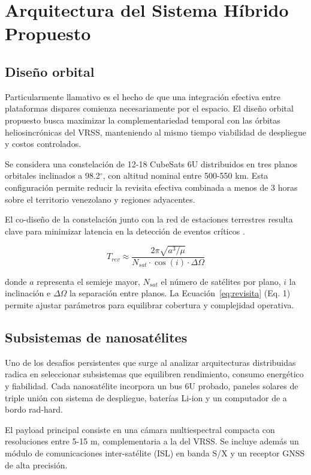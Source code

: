 \section{Arquitectura del Sistema Híbrido Propuesto}

\subsection{Diseño orbital}

Particularmente llamativo es el hecho de que una integración efectiva entre plataformas dispares comienza necesariamente por el espacio. El diseño orbital propuesto busca maximizar la complementariedad temporal con las órbitas heliosincrónicas del VRSS, manteniendo al mismo tiempo viabilidad de despliegue y costos controlados.

Se considera una constelación de 12-18 CubeSats 6U distribuidos en tres planos orbitales inclinados a 98.2$^\circ$, con altitud nominal entre 500-550 km. Esta configuración permite reducir la revisita efectiva combinada a menos de 3 horas sobre el territorio venezolano y regiones adyacentes. 

El co-diseño de la constelación junto con la red de estaciones terrestres resulta clave para minimizar latencia en la detección de eventos críticos \cite{arxiv250301756}. 

\begin{equation}
T_{rev} \approx \frac{2\pi \sqrt{a^3 / \mu}}{N_{sat} \cdot \cos(i) \cdot \Delta \Omega}
\label{eq:revisita}
\end{equation}

donde $a$ representa el semieje mayor, $N_{sat}$ el número de satélites por plano, $i$ la inclinación e $\Delta \Omega$ la separación entre planos. La Ecuación~\eqref{eq:revisita} (Eq. 1) permite ajustar parámetros para equilibrar cobertura y complejidad operativa.

\subsection{Subsistemas de nanosatélites}

Uno de los desafíos persistentes que surge al analizar arquitecturas distribuidas radica en seleccionar subsistemas que equilibren rendimiento, consumo energético y fiabilidad. Cada nanosatélite incorpora un bus 6U probado, paneles solares de triple unión con sistema de despliegue, baterías Li-ion y un computador de a bordo rad-hard.

El payload principal consiste en una cámara multiespectral compacta con resoluciones entre 5-15 m, complementaria a la del VRSS. Se incluye además un módulo de comunicaciones inter-satélite (ISL) en banda S/X y un receptor GNSS de alta precisión. 

